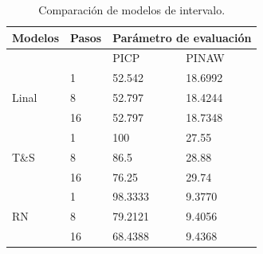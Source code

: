 \documentclass[12pt]{article}
\begin{document}
\begin{table}[htbp]
  \centering
  \caption{Comparación de modelos de intervalo.}
\begin{tabular}{|l|l|l|l|}
	\hline
	Modelos                & Pasos & \multicolumn{2}{l|}{Parámetro de evaluación} \\ \hline
	\multicolumn{2}{|l|}{}         & PICP                  & PINAW                \\ \hline
	\multirow{3}{*}{Linal} & 1     & 52.542                & 18.6992              \\ \cline{2-4} 
	& 8     & 52.797                & 18.4244              \\ \cline{2-4} 
	& 16    & 52.797                & 18.7348              \\ \hline
	\multirow{3}{*}{T\&S}  & 1     & 100                   & 27.55                \\ \cline{2-4} 
	& 8     & 86.5                  & 28.88                \\ \cline{2-4} 
	& 16    & 76.25                 & 29.74                \\ \hline
	\multirow{3}{*}{RN}    & 1     & 98.3333               & 9.3770               \\ \cline{2-4} 
	& 8     & 79.2121               & 9.4056               \\ \cline{2-4} 
	& 16    & 68.4388               & 9.4368               \\ \hline
\end{tabular}
  \label{t_CompCov}%
\end{table}%


				



\newpage


\end{document}
